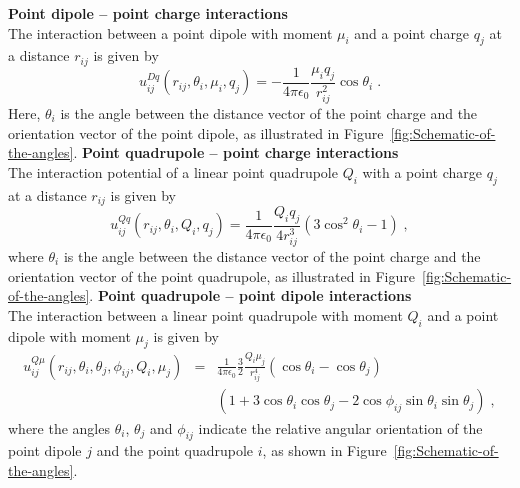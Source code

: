 \newline \newline
\textbf{Point dipole -- point charge interactions}\\
The interaction between a point dipole with moment $\mu_{i}$ and a point charge $q_{j}$ at a distance $r_{ij}$ is given by \parencite{hirschfelder, lorrain}
\begin{equation}
u^{Dq}_{ij}\left(r_{ij}, \theta_{i}, \mu_{i}, q_{j}\right)=-\frac{1}{4\pi \epsilon_{0}} \frac{\mu_{i} q_{j}}{r^{2}_{ij}} \cos \theta_{i} \;.
\label{eq:PointDipoleInteractions}
\end{equation}
Here, $\theta_{i}$ is the angle between the distance vector of the point charge and the orientation vector of the point dipole, as illustrated in Figure~\ref{fig:Schematic-of-the-angles}.
\newline \newline
\textbf{Point quadrupole -- point charge interactions}\\
The interaction potential of a linear point quadrupole $Q_{i}$ with a point charge $q_{j}$ at a distance $r_{ij}$ is given by \cite{Allen, gray}
\begin{equation}
u^{Qq}_{ij}\left(r_{ij},\theta_{i},Q_{i},q_{j}\right)=\frac{1}{4\pi \epsilon_{0}} \frac{Q_{i}q_{j}}{4 r^{3}_{ij}}\left(3\cos^{2}\theta_{i}-1\right) \;,
\label{eq:PointQuadrupoleInteractionsPointCharge}
\end{equation}
where $\theta_{i}$ is the angle between the distance vector of the point charge and the orientation vector of the point quadrupole, as illustrated in Figure~\ref{fig:Schematic-of-the-angles}.
\newline \newline
\textbf{Point quadrupole -- point dipole interactions}\\
The interaction between a linear point quadrupole with moment $Q_{i}$ and a point dipole with moment $\mu_{j}$ is given by \cite{gray, hirschfelder}
\begin{eqnarray}
u^{Q\mu}_{ij}\left(r_{ij},\theta_{i},\theta_{j},\phi_{ij},Q_{i},\mu_{j}\right) & = & \frac{1}{4\pi\epsilon_{0}}\frac{3}{2}\frac{Q_{i}\mu_{j}}{r^{4}_{ij}}\left(\cos \theta_{i}-\cos \theta_{j}\right) \nonumber \\
& & \left(1+3\cos \theta_{i} \cos \theta_{j}-2\cos \phi_{ij} \sin \theta_{i} \sin \theta_{j}\right) \;,
\label{eq:PointQuadrupoleInteractionsPointDipole}
\end{eqnarray}
where the angles $\theta_{i}$, $\theta_{j}$ and $\phi_{ij}$ indicate the relative angular orientation of the point dipole $j$ and the point quadrupole $i$, as shown in Figure~\ref{fig:Schematic-of-the-angles}.


